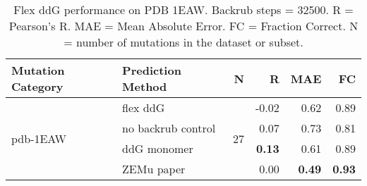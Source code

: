\begin{table}
  \begin{tabular}{llrrrr}
\toprule
Mutation Category &   Prediction Method &   N &     R &  MAE &   FC \\
\midrule
 \multirow{ 4}{*}{pdb-1EAW} & flex ddG & \multirow{ 4}{*}{27} & -0.02 & 0.62 & 0.89  \\
 & no backrub control & & 0.07 & 0.73 & 0.81  \\
 & ddG monomer & & \textbf{0.13} & 0.61 & 0.89  \\
 & ZEMu paper & & 0.00 & \textbf{0.49} & \textbf{0.93}  \\
\bottomrule
\end{tabular}
  \caption[Flex ddG performance on PDB 1EAW]{
    Flex ddG performance on PDB 1EAW. Backrub steps = 32500. R = Pearson's R. MAE = Mean Absolute Error. FC = Fraction Correct. N = number of mutations in the dataset or subset.
  } \label{tab:table-pdb-1EAW}
\end{table}
